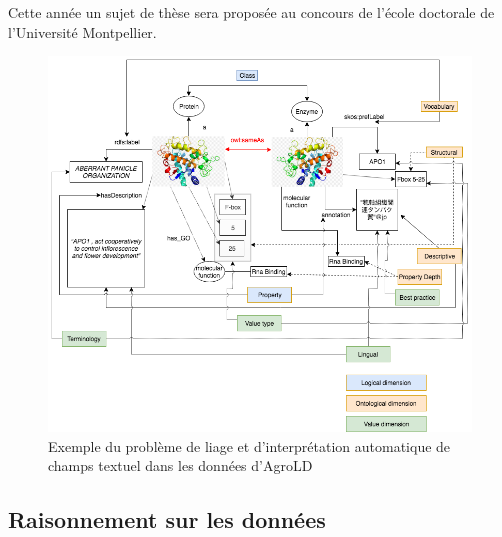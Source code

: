 Cette année un sujet de thèse sera proposée au concours de l’école doctorale de l’Université Montpellier. \\

%
\begin{figure}[!ht]
\begin{center}
	\includegraphics[width=1\textwidth]{Figures/exempleLiage.png}
\end{center}
\caption{\label{liage2} Exemple du problème de liage et d'interprétation automatique de champs textuel dans les données d’AgroLD}
\end{figure}


\subsection{Raisonnement sur les données}

